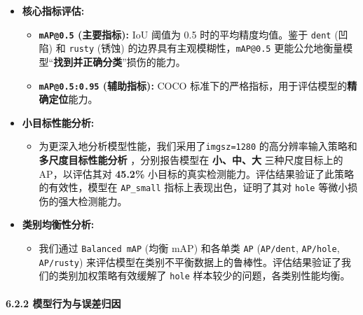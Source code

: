 \documentclass[
]{article}
\begin{document}
\begin{itemize}
\item
  \textbf{核心指标评估:}

  \begin{itemize}
  \item
    \textbf{\texttt{mAP@0.5} (主要指标):} IoU 阈值为 0.5
    时的平均精度均值。鉴于 \texttt{dent} (凹陷) 和 \texttt{rusty} (锈蚀)
    的边界具有主观模糊性，\texttt{mAP@0.5}
    更能公允地衡量模型``\textbf{找到并正确分类}''损伤的能力。
  \item
    \textbf{\texttt{mAP@0.5:0.95} (辅助指标):} COCO
    标准下的严格指标，用于评估模型的\textbf{精确定位}能力。
  \end{itemize}
\item
  \textbf{小目标性能分析:}

  \begin{itemize}
  \item
    为更深入地分析模型性能，我们采用了\texttt{imgsz=1280}
    的高分辨率输入策略和\textbf{多尺度目标性能分析} ，分别报告模型在
    \textbf{小、中、大} 三种尺度目标上的AP，以评估其对 \textbf{45.2\%}
    小目标的真实检测能力。评估结果验证了此策略的有效性，模型在
    \texttt{AP\_small} 指标上表现出色，证明了其对 \texttt{hole}
    等微小损伤的强大检测能力。
  \end{itemize}
\item
  \textbf{类别均衡性分析:}

  \begin{itemize}
  \item
    我们通过 \texttt{Balanced\ mAP} (均衡 mAP) 和各单类 \texttt{AP}
    (\texttt{AP/dent}, \texttt{AP/hole}, \texttt{AP/rusty})
    来评估模型在类别不平衡数据上的鲁棒性。评估结果验证了我们的类别加权策略有效缓解了
    \texttt{hole} 样本较少的问题，各类别性能均衡。
  \end{itemize}
\end{itemize}

\paragraph{6.2.2
模型行为与误差归因}\label{622-ux6a21ux578bux884cux4e3aux4e0eux8befux5deeux5f52ux56e0}
\end{document}
